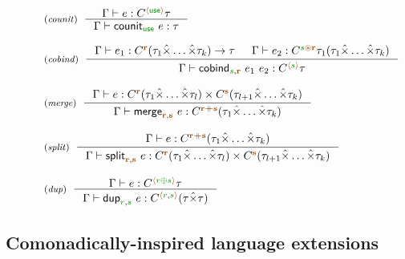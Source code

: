 \begin{figure}[t]
\begin{equation*}
\begin{array}{l}
\tyrule{counit}
  {\Gamma \vdash e : \ctyp{\alift{\cunit}}{\tau}}
  {\Gamma \vdash \ident{counit}_{\cunit}~e : \tau} \\
\\
\tyrule{cobind}
  {\Gamma \vdash e_1 : \ctyp{\aclrd{\textbf{r}}}{(\tau_1 \xtimes \ldots \xtimes \tau_k)} \rightarrow \tau & \Gamma \vdash e_2 : \ctyp{\cclrd{s}\aseq\aclrd{\textbf{r}}}{\tau_1(\tau_1 \xtimes \ldots \xtimes \tau_k)} }
  {\Gamma \vdash \ident{cobind}_{\cclrd{s}, \aclrd{\textbf{r}}}~e_1~e_2 : \ctyp{\alift{\cclrd{s}}}{\tau}} \\
  \\
\tyrule{merge}
  {\Gamma \vdash  e : \ctyp{\aclrd{\textbf{r}}}{(\tau_1 \xtimes \ldots \xtimes \tau_l)} \times \ctyp{\aclrd{\textbf{s}}}{(\tau_{l+1} \xtimes \ldots \xtimes \tau_k)} }
  {\Gamma \vdash  \ident{merge}_{\aclrd{\textbf{r}},\aclrd{\textbf{s}}}~e : \ctyp{\aclrd{\textbf{r}}\atimes\aclrd{\textbf{s}}}{(\tau_1 \xtimes \ldots \xtimes \tau_k)} }\\
\\
\tyrule{split}
  {\Gamma \vdash  e : \ctyp{\aclrd{\textbf{r}}\atimes\aclrd{\textbf{s}}}{(\tau_1 \xtimes \ldots \xtimes \tau_k)} }
  {\Gamma \vdash  \ident{split}_{\aclrd{\textbf{r}},\aclrd{\textbf{s}}}~e : \ctyp{\aclrd{\textbf{r}}}{(\tau_1 \xtimes \ldots \xtimes \tau_l)} \times \ctyp{\aclrd{\textbf{s}}}{(\tau_{l+1} \xtimes \ldots \xtimes \tau_k)}} \\
\\
\tyrule{dup}
  {\Gamma \vdash  e : \ctyp{\alift{\cclrd{r}\cpar\cclrd{s}}}{\tau} }
  {\Gamma \vdash  \ident{dup}_{\cclrd{r},\cclrd{s}}~e : \ctyp{\alift{\cclrd{r},\cclrd{s}}}{(\tau \xtimes \tau)} } \\
\end{array}
\end{equation*}

\label{fig:struct-semantics-ext}
\end{figure}


\subsection{Comonadically-inspired language extensions}
\label{sec:struct-transl-ext}

